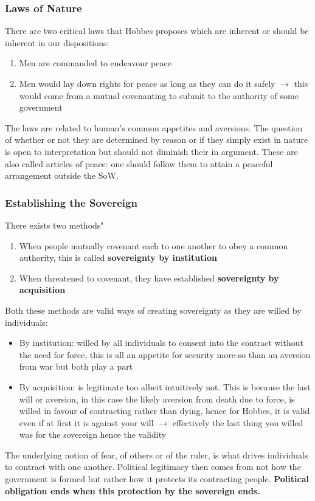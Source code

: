 \documentclass[12pt, letterpaper]{article}
\begin{document}
\subsubsection{Laws of Nature}
There are two critical laws that Hobbes proposes which are inherent or should be inherent in our dispositions:
\begin{enumerate}
	\item Men are commanded to endeavour peace
	\item Men would lay down rights for peace as long as they can do it safely $\rightarrow$ this would come from a mutual covenanting to submit to the authority of some government
\end{enumerate}
The laws are related to human's common appetites and aversions. The question of whether or not they are determined by reason or if they simply exist in nature is open to interpretation but should not diminish their in argument. These are also called articles of peace: one should follow them to attain a peaceful arrangement outside the SoW.

\subsubsection{Establishing the Sovereign}
There exists two methods"
\begin{enumerate}
	\item When people mutually covenant each to one another to obey a common authority, this is called \textbf{sovereignty by institution}
	\item When threatened to covenant, they have established \textbf{sovereignty by acquisition}
\end{enumerate}
Both these methods are valid ways of creating sovereignty as they are willed by individuals:
\begin{itemize}
	\item By institution: willed by all individuals to consent into the contract without the need for force, this is all an appetite for security more-so than an aversion from war but both play a part
	\item By acquisition: is legitimate too albeit intuitively not. This is because the last will or aversion, in this case the likely aversion from death due to force, is willed in favour of contracting rather than dying, hence for Hobbes, it is valid even if at first it is against your will $\rightarrow$ effectively the last thing you willed was for the sovereign hence the validity
\end{itemize}
The underlying notion of fear, of others or of the ruler, is what drives individuals to contract with one another. Political legitimacy then comes from not how the government is formed but rather how it protects its contracting people. \textbf{Political obligation ends when this protection by the sovereign ends.}
\end{document}
